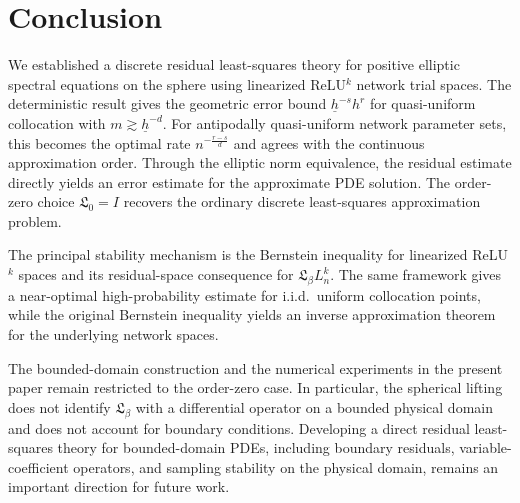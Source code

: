 \documentclass{article}
\numberwithin{equation}{section}
\begin{document}





\section{Conclusion}

We established a discrete residual least-squares theory for positive elliptic spectral equations on the sphere using linearized ReLU$^k$ network trial spaces. The deterministic result gives the geometric error bound $\underline h^{-s}h^r$ for quasi-uniform collocation with $m\gtrsim\underline h^{-d}$. For antipodally quasi-uniform network parameter sets, this becomes the optimal rate $n^{-\frac{r-s}{d}}$ and agrees with the continuous approximation order. Through the elliptic norm equivalence, the residual estimate directly yields an error estimate for the approximate PDE solution. The order-zero choice $\mathfrak L_0=I$ recovers the ordinary discrete least-squares approximation problem.

The principal stability mechanism is the Bernstein inequality for linearized ReLU$^k$ spaces and its residual-space consequence for $\mathfrak L_\beta L_n^k$. The same framework gives a near-optimal high-probability estimate for i.i.d.\ uniform collocation points, while the original Bernstein inequality yields an inverse approximation theorem for the underlying network spaces.

The bounded-domain construction and the numerical experiments in the present paper remain restricted to the order-zero case. In particular, the spherical lifting does not identify $\mathfrak L_\beta$ with a differential operator on a bounded physical domain and does not account for boundary conditions. Developing a direct residual least-squares theory for bounded-domain PDEs, including boundary residuals, variable-coefficient operators, and sampling stability on the physical domain, remains an important direction for future work.
\end{document}
